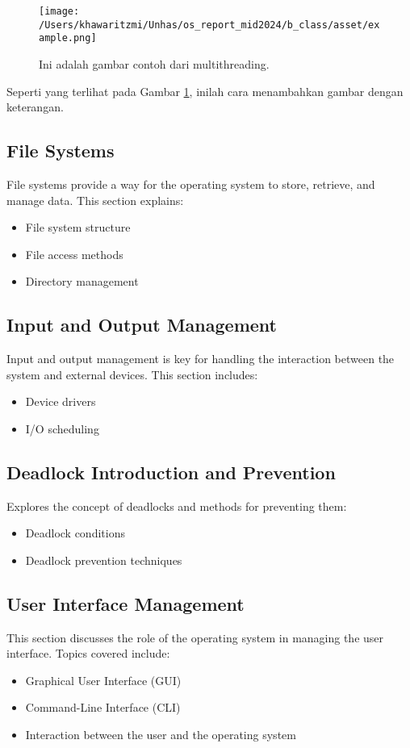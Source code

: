 \documentclass[12pt]{article}
\begin{document}
\begin{figure}[h]
    \centering
    \texttt{[image: /Users/khawaritzmi/Unhas/os\_report\_mid2024/b\_class/asset/example.png]}  %
    \caption{Ini adalah gambar contoh dari multithreading.}
    \label{fig:contoh_gambar}
\end{figure}

Seperti yang terlihat pada Gambar \ref{fig:contoh_gambar}, inilah cara menambahkan gambar dengan keterangan.

\subsection{File Systems}
File systems provide a way for the operating system to store, retrieve, and manage data. This section explains:
\begin{itemize}
    \item File system structure
    \item File access methods
    \item Directory management
\end{itemize}

\subsection{Input and Output Management}
Input and output management is key for handling the interaction between the system and external devices. This section includes:
\begin{itemize}
    \item Device drivers
    \item I/O scheduling
\end{itemize}

\subsection{Deadlock Introduction and Prevention}
Explores the concept of deadlocks and methods for preventing them:
\begin{itemize}
    \item Deadlock conditions
    \item Deadlock prevention techniques
\end{itemize}

\subsection{User Interface Management}
This section discusses the role of the operating system in managing the user interface. Topics covered include:
\begin{itemize}
    \item Graphical User Interface (GUI)
    \item Command-Line Interface (CLI)
    \item Interaction between the user and the operating system
\end{itemize}
\end{document}
